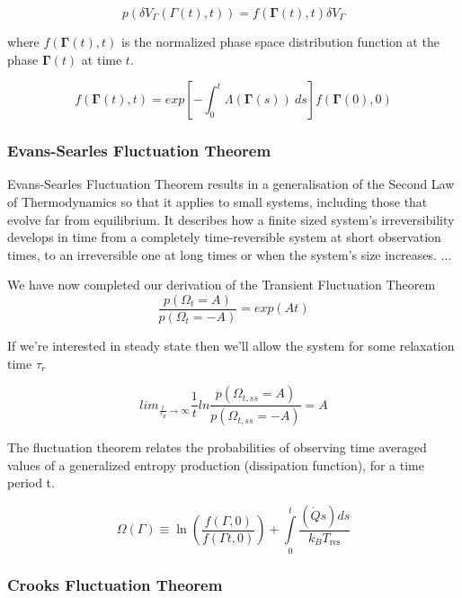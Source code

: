 \documentclass[a4paper,12pt,nofootinbib]{article}
\begin{document}
\begin{equation}
  p(\delta V_{\Gamma}(\Gamma(t),t)) = f(\bm{\Gamma}(t),t)\delta V_{\Gamma}
\end{equation}

where $f(\bm{\Gamma}(t),t)$ is the normalized phase space distribution function at the phase $\bm{\Gamma}(t)$ at time $t$.

\begin{equation}
  f(\bm{\Gamma}(t),t)= exp[- \int_0^t \Lambda(\bm{\Gamma}(s))\ ds ]f(\bm{\Gamma}(0),0)
\end{equation}



\subsubsection{Evans-Searles Fluctuation Theorem}
Evans-Searles Fluctuation Theorem results in a generalisation of the Second Law of Thermodynamics so that it applies to small systems, including those that evolve far from equilibrium.
It describes how a finite sized system's irreversibility develops in time from a completely time-reversible system at short observation times, to an irreversible one at long times or when the system's size increases. 
...

We have now completed our derivation of the Transient Fluctuation Theorem
\begin{displaymath}
  \frac{p(\Omega_t=A)}{p(\Omega_t=-A)}=exp(A t)
\end{displaymath}


If we're interested in steady state then we'll allow the system for some relaxation time $\tau_r$

\begin{displaymath}
  lim_{\frac{t}{\tau_R}\rightarrow \infty} \frac{1}{t} ln{\frac{p(\Omega_{t,ss}=A)}{p(\Omega_{t,ss}=-A)}} =A
\end{displaymath}


The fluctuation theorem relates the probabilities of observing time averaged values of a generalized entropy production (dissipation function), for a time period t.

\begin{displaymath}
  \Omega(\Gamma) \equiv \ln \left(\frac{f(\Gamma ,0)}{f(\Gamma  t,0)}\right)+\underset{0}{\overset{t}{\int }}\frac{\left(\dot{Q} s\right) ds}{k_B T_{\text{res}}}
\end{displaymath}

\subsubsection{Crooks Fluctuation Theorem}
\end{document}
